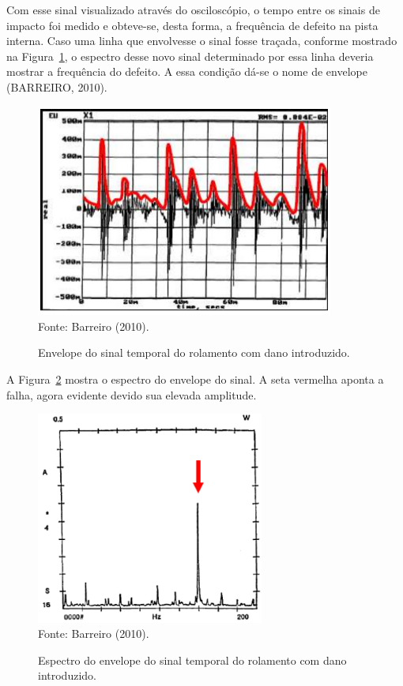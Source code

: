 \documentclass[
	12pt,				
	oneside,			
	a4paper,			
	english,			
	brazil,	
	sumario=abnt-6027-2012		
	]{abntex2ppgsi}
\begin{document}
Com esse sinal visualizado através do osciloscópio, o tempo entre os sinais de impacto foi medido e obteve-se, desta forma, a frequência de defeito na pista interna. Caso uma linha que envolvesse o sinal fosse traçada, conforme mostrado na Figura~\ref{sinal_envelope_rolamento_barreiro}, o espectro desse novo sinal determinado por essa linha deveria mostrar a frequência do defeito. A essa condição dá-se o nome de envelope (BARREIRO, 2010). 

\begin{figure}[H]
\centering
\caption {Envelope do sinal temporal do rolamento com dano introduzido.}
\includegraphics[width=\textwidth,height=70mm,keepaspectratio]{sinal_envelope_rolamento_barreiro} \\
Fonte: Barreiro (2010).
\label{sinal_envelope_rolamento_barreiro}
\end{figure}

A Figura~\ref{espectro_do_envelope_barreiro} mostra o espectro do envelope do sinal. A seta vermelha aponta a falha, agora evidente devido sua elevada amplitude.

\begin{figure}[H]
\centering
\caption {Espectro do envelope do sinal temporal do rolamento com dano introduzido.}
\includegraphics[width=\textwidth,height=70mm,keepaspectratio]{espectro_do_envelope_barreiro} \\
Fonte: Barreiro (2010).
\label{espectro_do_envelope_barreiro}
\end{figure}
\end{document}
